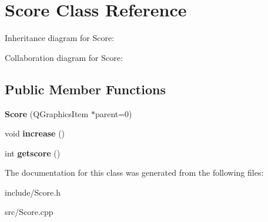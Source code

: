 \hypertarget{classScore}{}\section{Score Class Reference}
\label{classScore}


Inheritance diagram for Score\+:


Collaboration diagram for Score\+:
\subsection*{Public Member Functions}
\begin{DoxyCompactItemize}
\item 
\mbox{\label{classScore_af7c3392a27388a66b8a94448a995634d}} 
{\bfseries Score} (Q\+Graphics\+Item $\ast$parent=0)
\item 
\mbox{\label{classScore_ab5dbfab6935903c075509546878cfbda}} 
void {\bfseries increase} ()
\item 
\mbox{\label{classScore_a2b3d2360a70e9cb9a297af9b67c1112b}} 
int {\bfseries getscore} ()
\end{DoxyCompactItemize}


The documentation for this class was generated from the following files\+:\begin{DoxyCompactItemize}
\item 
include/Score.\+h\item 
src/Score.\+cpp\end{DoxyCompactItemize}
